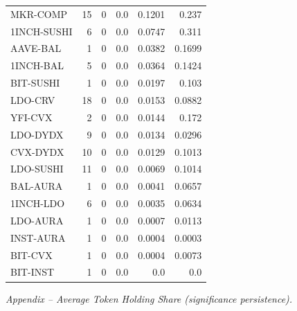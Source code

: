 \begin{table}[!ht]
{\begin{tabular}{lrrrrr}
MKR-COMP & 15 & 0 & 0.0 & 0.1201 & 0.237 \\
1INCH-SUSHI & 6 & 0 & 0.0 & 0.0747 & 0.311 \\
AAVE-BAL & 1 & 0 & 0.0 & 0.0382 & 0.1699 \\
1INCH-BAL & 5 & 0 & 0.0 & 0.0364 & 0.1424 \\
BIT-SUSHI & 1 & 0 & 0.0 & 0.0197 & 0.103 \\
LDO-CRV & 18 & 0 & 0.0 & 0.0153 & 0.0882 \\
YFI-CVX & 2 & 0 & 0.0 & 0.0144 & 0.172 \\
LDO-DYDX & 9 & 0 & 0.0 & 0.0134 & 0.0296 \\
CVX-DYDX & 10 & 0 & 0.0 & 0.0129 & 0.1013 \\
LDO-SUSHI & 11 & 0 & 0.0 & 0.0069 & 0.1014 \\
BAL-AURA & 1 & 0 & 0.0 & 0.0041 & 0.0657 \\
1INCH-LDO & 6 & 0 & 0.0 & 0.0035 & 0.0634 \\
LDO-AURA & 1 & 0 & 0.0 & 0.0007 & 0.0113 \\
INST-AURA & 1 & 0 & 0.0 & 0.0004 & 0.0003 \\
BIT-CVX & 1 & 0 & 0.0 & 0.0004 & 0.0073 \\
BIT-INST & 1 & 0 & 0.0 & 0.0 & 0.0 \\
\hline
\end{tabular}
}
\vspace{2mm}\textit{Appendix – Average Token Holding Share (significance persistence).}
\end{table}